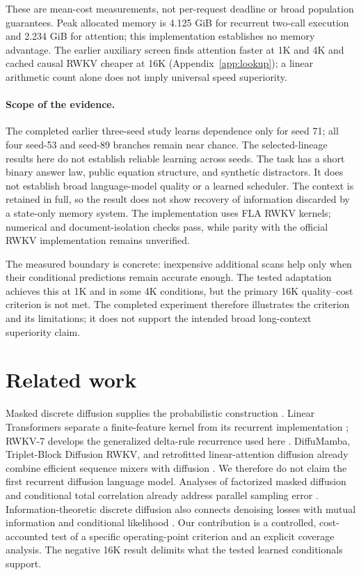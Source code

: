 \documentclass{article}
\begin{document}
These are mean-cost measurements, not per-request deadline or broad population
guarantees. Peak allocated memory is 4.125 GiB for recurrent two-call execution
and 2.234 GiB for attention; this implementation establishes no memory advantage.
The earlier auxiliary screen finds attention faster at 1K and 4K and cached
causal RWKV cheaper at 16K (Appendix~\ref{app:lookup}); a linear arithmetic
count alone does not imply universal speed superiority.

\paragraph{Scope of the evidence.}
The completed earlier three-seed study learns dependence only for seed 71;
all four seed-53 and seed-89 branches remain near chance. The selected-lineage
results here do not establish reliable learning across seeds. The task has
a short binary answer law, public equation structure, and synthetic distractors.
It does not establish broad language-model quality or a learned scheduler.
The context is retained in full, so the result does not show recovery of
information discarded by a state-only memory system. The implementation uses
FLA RWKV kernels; numerical and document-isolation checks pass, while parity
with the official RWKV implementation remains unverified.

The measured boundary is concrete: inexpensive additional scans help only
when their conditional predictions remain accurate enough. The tested
adaptation achieves this at 1K and in some 4K conditions, but the primary
16K quality--cost criterion is not met. The completed experiment therefore
illustrates the criterion and its limitations; it does not support the intended broad
long-context superiority claim.

\section{Related work}
Masked discrete diffusion supplies the probabilistic construction
\citep{d3pm,mdlm}. Linear Transformers separate a finite-feature kernel from its
recurrent implementation \citep{lineartransformer}; RWKV-7 develops the
generalized delta-rule recurrence used here \citep{rwkv7}. DiffuMamba,
Triplet-Block Diffusion RWKV, and retrofitted linear-attention diffusion already
combine efficient sequence mixers with diffusion
\citep{diffumamba,triplet,retrofit}. We therefore do not claim the first recurrent
diffusion language model. Analyses of factorized masked diffusion and
conditional total correlation already address parallel sampling error
\citep{factorization2025,ctcdepth2026,intrinsicdependence2026}.
Information-theoretic discrete diffusion also connects denoising losses with
mutual information and conditional likelihood \citep{infodiscrete2025}.
Our contribution is a controlled, cost-accounted test of a specific
operating-point criterion and an explicit coverage analysis. The negative
16K result delimits what the tested learned conditionals support.
\end{document}
